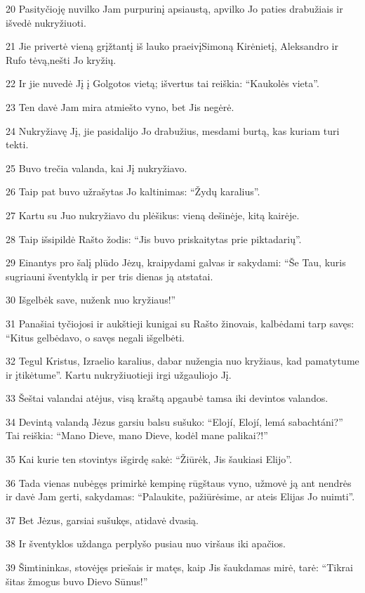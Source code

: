 \par 20 Pasityčioję nuvilko Jam purpurinį apsiaustą, apvilko Jo paties drabužiais ir išvedė nukryžiuoti. 
\par 21 Jie privertė vieną grįžtantį iš lauko praeivį­Simoną Kirėnietį, Aleksandro ir Rufo tėvą,­nešti Jo kryžių. 
\par 22 Ir jie nuvedė Jį į Golgotos vietą; išvertus tai reiškia: “Kaukolės vieta”. 
\par 23 Ten davė Jam mira atmiešto vyno, bet Jis negėrė. 
\par 24 Nukryžiavę Jį, jie pasidalijo Jo drabužius, mesdami burtą, kas kuriam turi tekti. 
\par 25 Buvo trečia valanda, kai Jį nukryžiavo. 
\par 26 Taip pat buvo užrašytas Jo kaltinimas: “Žydų karalius”. 
\par 27 Kartu su Juo nukryžiavo du plėšikus: vieną dešinėje, kitą kairėje. 
\par 28 Taip išsipildė Rašto žodis: “Jis buvo priskaitytas prie piktadarių”. 
\par 29 Einantys pro šalį plūdo Jėzų, kraipydami galvas ir sakydami: “Še Tau, kuris sugriauni šventyklą ir per tris dienas ją atstatai. 
\par 30 Išgelbėk save, nuženk nuo kryžiaus!” 
\par 31 Panašiai tyčiojosi ir aukštieji kunigai su Rašto žinovais, kalbėdami tarp savęs: “Kitus gelbėdavo, o savęs negali išgelbėti. 
\par 32 Tegul Kristus, Izraelio karalius, dabar nužengia nuo kryžiaus, kad pamatytume ir įtikėtume”. Kartu nukryžiuotieji irgi užgauliojo Jį. 
\par 33 Šeštai valandai atėjus, visą kraštą apgaubė tamsa iki devintos valandos. 
\par 34 Devintą valandą Jėzus garsiu balsu sušuko: “Elojí, Elojí, lemá sabachtáni?” Tai reiškia: “Mano Dieve, mano Dieve, kodėl mane palikai?!” 
\par 35 Kai kurie ten stovintys išgirdę sakė: “Žiūrėk, Jis šaukiasi Elijo”. 
\par 36 Tada vienas nubėgęs primirkė kempinę rūgštaus vyno, užmovė ją ant nendrės ir davė Jam gerti, sakydamas: “Palaukite, pažiūrėsime, ar ateis Elijas Jo nuimti”. 
\par 37 Bet Jėzus, garsiai sušukęs, atidavė dvasią. 
\par 38 Ir šventyklos uždanga perplyšo pusiau nuo viršaus iki apačios. 
\par 39 Šimtininkas, stovėjęs priešais ir matęs, kaip Jis šaukdamas mirė, tarė: “Tikrai šitas žmogus buvo Dievo Sūnus!” 
